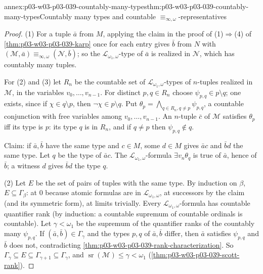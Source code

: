 \begin{annexitem}{annex:p03-w03-p03-039-countably-many-types}{thm:p03-w03-p03-039-countably-many-types}{Countably many types and countable \(\equiv_{\infty,\omega}\)-representatives}
\begin{proof}
(1) For a tuple \(\bar a\) from \(M\), applying the claim in the proof of
(1)\(\Rightarrow\)(4) of \cref{thm:p03-w03-p03-039-karp} once for each entry
gives \(\bar b\) from \(N\) with
\((\mathcal M,\bar a)\equiv_{\infty,\omega}(\mathcal N,\bar b)\); so the
\(\mathcal L_{\omega_1,\omega}\)-type of \(\bar a\) is realized in
\(\mathcal N\), which has countably many tuples.

For (2) and (3) let \(R_n\) be the countable set of
\(\mathcal L_{\omega_1,\omega}\)-types of \(n\)-tuples realized in
\(\mathcal M\), in the variables \(v_0,\ldots,v_{n-1}\). For distinct
\(p,q\in R_n\) choose \(\psi_{p,q}\in p\setminus q\); one exists, since if
\(\chi\in q\setminus p\), then \(\neg\chi\in p\setminus q\). Put
\(\theta_p=\bigwedge_{q\in R_n,q\ne p}\psi_{p,q}\), a countable conjunction
with free variables among \(v_0,\ldots,v_{n-1}\). An \(n\)-tuple \(\bar c\)
of \(\mathcal M\) satisfies \(\theta_p\) iff its type is \(p\): its type
\(q\) is in \(R_n\), and if \(q\ne p\) then \(\psi_{p,q}\notin q\).

Claim: if \(\bar a,\bar b\) have the same type and \(c\in M\), some \(d\in M\)
gives \(\bar ac\) and \(\bar bd\) the same type. Let \(q\) be the type of
\(\bar ac\). The \(\mathcal L_{\omega_1,\omega}\)-formula
\(\exists v_n\theta_q\) is true of \(\bar a\), hence of \(\bar b\); a witness
\(d\) gives \(\bar bd\) the type \(q\).

(2) Let \(E\) be the set of pairs of tuples with the same type. By induction
on \(\beta\), \(E\subseteq\Gamma_\beta\): at \(0\) because atomic formulas are
in \(\mathcal L_{\omega_1,\omega}\), at successors by the claim (and its
symmetric form), at limits trivially. Every \(\mathcal L_{\omega_1,\omega}\)-formula
has countable quantifier rank (by induction: a countable supremum of
countable ordinals is countable). Let \(\gamma<\omega_1\) be the supremum of
the quantifier ranks of the countably many \(\psi_{p,q}\). If
\((\bar a,\bar b)\in\Gamma_\gamma\) and the types \(p,q\) of \(\bar a,\bar b\)
differ, then \(\bar a\) satisfies \(\psi_{p,q}\) and \(\bar b\) does not,
contradicting \cref{thm:p03-w03-p03-039-rank-characterization}. So
\(\Gamma_\gamma\subseteq E\subseteq\Gamma_{\gamma+1}\subseteq\Gamma_\gamma\),
and \(\operatorname{sr}(\mathcal M)\le\gamma<\omega_1\)
(\cref{thm:p03-w03-p03-039-scott-rank}).


\end{proof}
\end{annexitem}
